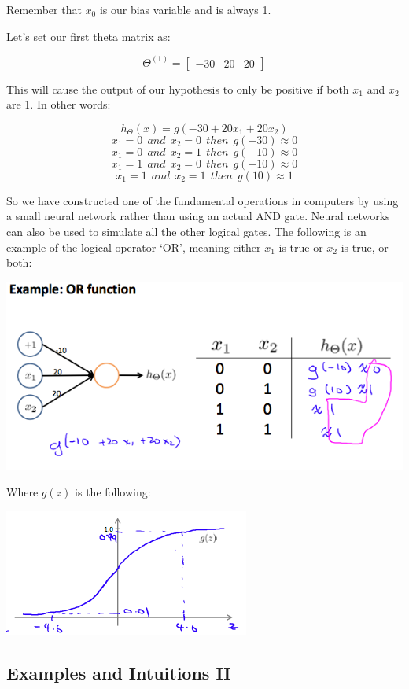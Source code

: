 \documentclass[UTF8]{article}
\begin{document}
Remember that $x_0$ is our bias variable and is always 1.

Let's set our first theta matrix as:

\[\Theta^{(1)} =\begin{bmatrix}-30 & 20 & 20\end{bmatrix}\]

This will cause the output of our hypothesis to only be positive if both $x_1$ and $x_2$ are 1. In other words:

\[h_\Theta(x) = g(-30 + 20x_1 + 20x_2) \]
\[ x_1 = 0 \ \ and \ \ x_2 = 0 \ \ then \ \ g(-30) \approx 0 \]
\[ x_1 = 0 \ \ and \ \ x_2 = 1 \ \ then \ \ g(-10) \approx 0 \]
\[ x_1 = 1 \ \ and \ \ x_2 = 0 \ \ then \ \ g(-10) \approx 0 \]
\[ x_1 = 1 \ \ and \ \ x_2 = 1 \ \ then \ \ g(10) \approx 1\]

So we have constructed one of the fundamental operations in computers by using a small neural network rather than using an actual AND gate. Neural networks can also be used to simulate all the other logical gates. The following is an example of the logical operator `OR', meaning either $x_1$ is true or $x_2$ is true, or both:

\includegraphics[width = .8\textwidth]{NotePics/8_3_1.png}

Where $g(z)$ is the following:

\includegraphics[width = .8\textwidth]{NotePics/8_3_2.png}

\subsection{Examples and Intuitions II}
\end{document}
